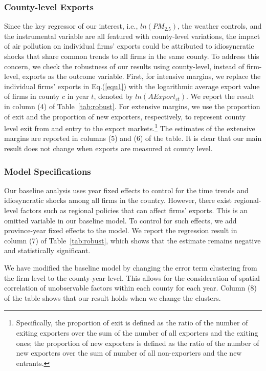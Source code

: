 \documentclass[12pt]{article}
\begin{document}
\subsubsection{County-level Exports}
Since the key regressor of our interest,  i.e., $ln(PM_{2.5})$, the weather
controls, and the instrumental variable are all featured with county-level
variations, the impact of air pollution on individual firms' exports could
be attributed to idiosyncratic shocks that share common trends to all firms
in the same county. To address this concern, we check the robustness of our
results using county-level, instead of firm-level, exports as the outcome
variable. First, for intensive margins, we
replace the individual firms' exports in Eq.(\ref{equ1}) with the
logarithmic average export value of firms in county $c$ in year $t$, denoted
by $ln(AExport_{ct})$. We report the result in column (4) of Table~\ref{tab:robust}. For extensive margins, we use 
the proportion of exit and the proportion of new exporters, respectively, to represent county level exit from and entry to the export markets.\footnote{Specifically, the proportion of exit is defined as 
the ratio of the number of
exiting exporters over the sum of the number of all exporters and the exiting
ones; the proportion of new exporters is defined as 
the ratio of the number of new exporters over the sum of number of all non-exporters and the new entrants.} The estimates of
the extensive margins are reported in columns (5) and (6) of the table. It
is clear that our main result does not change when exports are measured at
county level. 

\subsubsection{Model Specifications}
Our baseline analysis uses year fixed effects to control for the time trends
and idiosyncratic shocks among all firms in the country. However, there
exist regional-level factors such as regional policies that can affect
firms' exports. This is an omitted variable in our baseline model. To
control for such effects, we add province-year fixed effects to the model.
We report the regression result in column (7) of Table~\ref{tab:robust},
which shows that the estimate remains negative and statistically
significant.

We have modified the baseline model by changing the error term clustering from the firm level to the county-year level. This allows for the consideration of spatial correlation of unobservable factors within each county for each year. Column (8) of the table shows that our result holds when we change the clusters.
\end{document}
